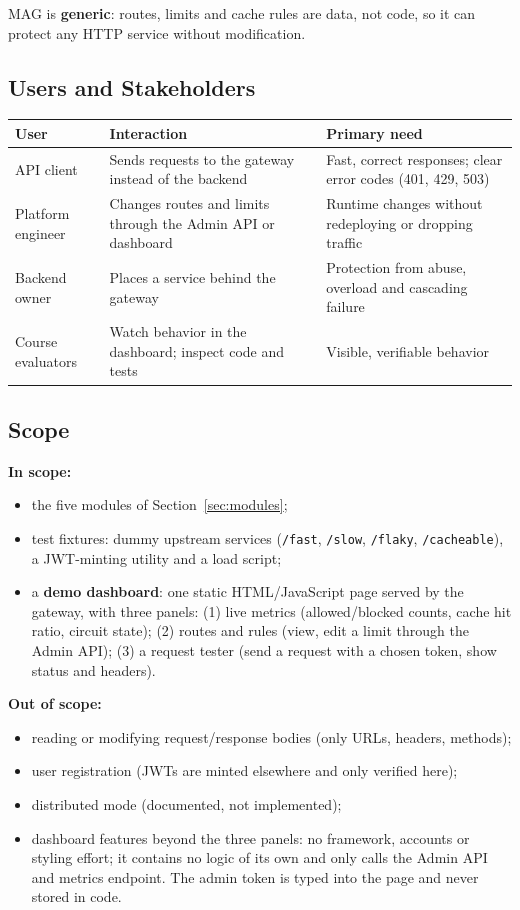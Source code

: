 \documentclass[12pt,a4paper]{article}
\newcommand{\cls}[1]{\nolinkurl{#1}}
\begin{document}
MAG is \textbf{generic}: routes, limits and cache rules are data, not code, so it can protect any HTTP service without modification.

\subsection{Users and Stakeholders}
\begingroup
\small
\setlength{\tabcolsep}{4pt}
\begin{tabular}{L{3.4cm} L{5.4cm} L{5.4cm}}
\toprule
\textbf{User} & \textbf{Interaction} & \textbf{Primary need} \\
\midrule
API client & Sends requests to the gateway instead of the backend & Fast, correct responses; clear error codes (401, 429, 503) \\
Platform engineer & Changes routes and limits through the Admin API or dashboard & Runtime changes without redeploying or dropping traffic \\
Backend owner & Places a service behind the gateway & Protection from abuse, overload and cascading failure \\
Course evaluators & Watch behavior in the dashboard; inspect code and tests & Visible, verifiable behavior \\
\bottomrule
\end{tabular}
\endgroup

\subsection{Scope}
\label{sec:scope}
\textbf{In scope:}
\begin{itemize}[noitemsep]
    \item the five modules of Section~\ref{sec:modules};
    \item test fixtures: dummy upstream services (\cls{/fast}, \cls{/slow}, \cls{/flaky}, \cls{/cacheable}), a JWT-minting utility and a load script;
    \item a \textbf{demo dashboard}: one static HTML/JavaScript page served by the gateway, with three panels: (1) live metrics (allowed/blocked counts, cache hit ratio, circuit state); (2) routes and rules (view, edit a limit through the Admin API); (3) a request tester (send a request with a chosen token, show status and headers).
\end{itemize}

\textbf{Out of scope:}
\begin{itemize}[noitemsep]
    \item reading or modifying request/response bodies (only URLs, headers, methods);
    \item user registration (JWTs are minted elsewhere and only verified here);
    \item distributed mode (documented, not implemented);
    \item dashboard features beyond the three panels: no framework, accounts or styling effort; it contains no logic of its own and only calls the Admin API and metrics endpoint. The admin token is typed into the page and never stored in code.
\end{itemize}
\end{document}
